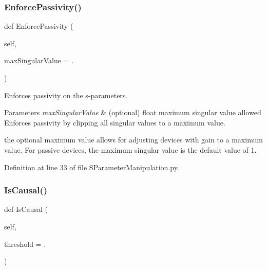 \subsubsection{\texorpdfstring{Enforce\+Passivity()}{EnforcePassivity()}}
{\footnotesize\ttfamily def Enforce\+Passivity (\begin{DoxyParamCaption}\item[{}]{self,  }\item[{}]{max\+Singular\+Value = {.} }\end{DoxyParamCaption})}



Enforces passivity on the s-\/parameters. 


\begin{DoxyParams}{Parameters}
{\em max\+Singular\+Value} & (optional) float maximum singular value allowed Enforces passivity by clipping all singular values to a maximum value.\\
\hline
\end{DoxyParams}
the optional maximum value allows for adjusting devices with gain to a maximum value. For passive devices, the maximum singular value is the default value of 1. 

Definition at line 33 of file S\+Parameter\+Manipulation.\+py.

\mbox{\label{classSignalIntegrity_1_1SParameters_1_1SParameterManipulation_1_1SParameterManipulation_a4bb07518fdccfa71483dc4e98eb83083}} 
\subsubsection{\texorpdfstring{Is\+Causal()}{IsCausal()}}
{\footnotesize\ttfamily def Is\+Causal (\begin{DoxyParamCaption}\item[{}]{self,  }\item[{}]{threshold = {.} }\end{DoxyParamCaption})}



